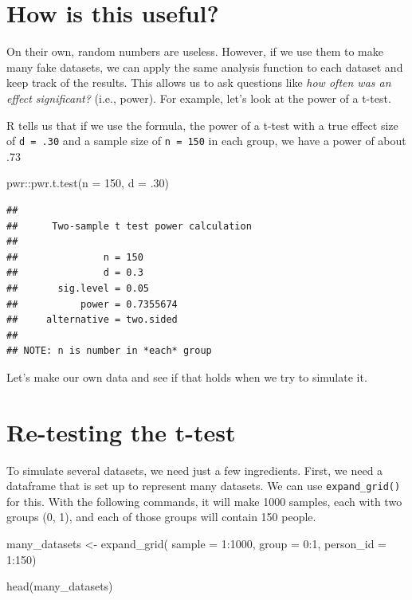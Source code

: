 \documentclass[
]{book}
\newenvironment{Shaded}{\begin{snugshade}}{\end{snugshade}}
\newcommand{\AttributeTok}[1]{\textcolor[rgb]{0.77,0.63,0.00}{#1}}
\newcommand{\DecValTok}[1]{\textcolor[rgb]{0.00,0.00,0.81}{#1}}
\newcommand{\FunctionTok}[1]{\textcolor[rgb]{0.00,0.00,0.00}{#1}}
\newcommand{\NormalTok}[1]{#1}
\newcommand{\OtherTok}[1]{\textcolor[rgb]{0.56,0.35,0.01}{#1}}
\newcommand{\SpecialCharTok}[1]{\textcolor[rgb]{0.00,0.00,0.00}{#1}}
\begin{document}
\hypertarget{how-is-this-useful}{%
\section{How is this useful?}\label{how-is-this-useful}}

On their own, random numbers are useless. However, if we use them to make many fake datasets, we can apply the same analysis function to each dataset and keep track of the results. This allows us to ask questions like \emph{how often was an effect significant?} (i.e., power). For example, let's look at the power of a t-test.

R tells us that if we use the formula, the power of a t-test with a true effect size of \texttt{d\ =\ .30} and a sample size of \texttt{n\ =\ 150} in each group, we have a power of about .73

\begin{Shaded}
\begin{Highlighting}[]
\NormalTok{pwr}\SpecialCharTok{::}\FunctionTok{pwr.t.test}\NormalTok{(}\AttributeTok{n =} \DecValTok{150}\NormalTok{, }\AttributeTok{d =}\NormalTok{ .}\DecValTok{30}\NormalTok{)}
\end{Highlighting}
\end{Shaded}

\begin{verbatim}
## 
##      Two-sample t test power calculation 
## 
##               n = 150
##               d = 0.3
##       sig.level = 0.05
##           power = 0.7355674
##     alternative = two.sided
## 
## NOTE: n is number in *each* group
\end{verbatim}

Let's make our own data and see if that holds when we try to simulate it.

\hypertarget{re-testing-the-t-test}{%
\section{Re-testing the t-test}\label{re-testing-the-t-test}}

To simulate several datasets, we need just a few ingredients. First, we need a dataframe that is set up to represent many datasets. We can use \texttt{expand\_grid()} for this. With the following commands, it will make 1000 samples, each with two groups (0, 1), and each of those groups will contain 150 people.

\begin{Shaded}
\begin{Highlighting}[]
\NormalTok{many\_datasets }\OtherTok{\textless{}{-}} \FunctionTok{expand\_grid}\NormalTok{(}
  \AttributeTok{sample =} \DecValTok{1}\SpecialCharTok{:}\DecValTok{1000}\NormalTok{, }
  \AttributeTok{group =} \DecValTok{0}\SpecialCharTok{:}\DecValTok{1}\NormalTok{, }
  \AttributeTok{person\_id =} \DecValTok{1}\SpecialCharTok{:}\DecValTok{150}\NormalTok{)}

\FunctionTok{head}\NormalTok{(many\_datasets)}
\end{Highlighting}
\end{Shaded}
\end{document}
